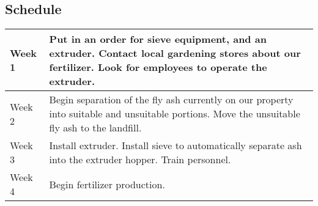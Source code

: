 \documentclass[a4paper,10pt]{article}
\begin{document}
\begin{multicols*}{2}
\subsection*{Schedule}
\bgroup
\def\arraystretch{1.5}

\begin{tabular}{| l | p{6cm} |}
\hline
Week 1 & Put in an order for sieve equipment, and an extruder. Contact local gardening stores about our fertilizer. 
Look for employees to operate the extruder.\\
\hline
Week 2 & Begin separation of the fly ash currently on our property into suitable and unsuitable portions. 
Move the unsuitable fly ash to the landfill. \\ 
\hline
Week 3 & Install extruder. Install sieve to automatically separate ash into the extruder hopper. Train personnel.\\ \hline
Week 4 & Begin fertilizer production. \\
\hline
\end{tabular}

\egroup

\end{multicols*}
\end{document}
